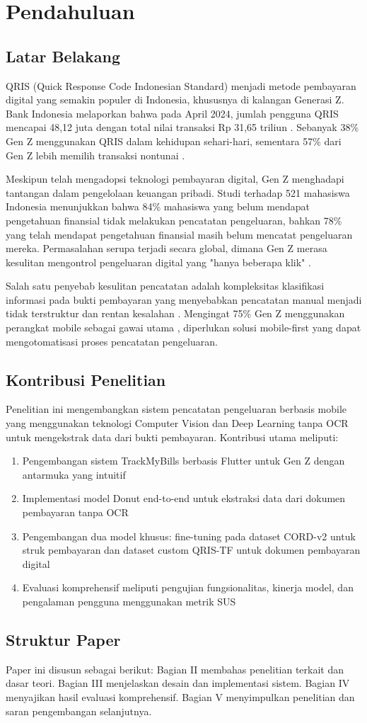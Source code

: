 \section{Pendahuluan}

\subsection{Latar Belakang}
QRIS (Quick Response Code Indonesian Standard) menjadi metode pembayaran digital yang semakin populer di Indonesia, khususnya di kalangan Generasi Z. Bank Indonesia melaporkan bahwa pada April 2024, jumlah pengguna QRIS mencapai 48,12 juta dengan total nilai transaksi Rp 31,65 triliun \cite{CNNqris2024}. Sebanyak 38\% Gen Z menggunakan QRIS dalam kehidupan sehari-hari, sementara 57\% dari Gen Z lebih memilih transaksi nontunai \cite{qris2023goodstats,jawapos2024qris}.

Meskipun telah mengadopsi teknologi pembayaran digital, Gen Z menghadapi tantangan dalam pengelolaan keuangan pribadi. Studi \cite{johan2021effect} terhadap 521 mahasiswa Indonesia menunjukkan bahwa 84\% mahasiswa yang belum mendapat pengetahuan finansial tidak melakukan pencatatan pengeluaran, bahkan 78\% yang telah mendapat pengetahuan finansial masih belum mencatat pengeluaran mereka. Permasalahan serupa terjadi secara global, dimana Gen Z merasa kesulitan mengontrol pengeluaran digital yang "hanya beberapa klik" \cite{lewis2019follow}.

Salah satu penyebab kesulitan pencatatan adalah kompleksitas klasifikasi informasi pada bukti pembayaran yang menyebabkan pencatatan manual menjadi tidak terstruktur dan rentan kesalahan \cite{kaye2014money}. Mengingat 75\% Gen Z menggunakan perangkat mobile sebagai gawai utama \cite{Campfire2024GenZ}, diperlukan solusi mobile-first yang dapat mengotomatisasi proses pencatatan pengeluaran.

\subsection{Kontribusi Penelitian}
Penelitian ini mengembangkan sistem pencatatan pengeluaran berbasis mobile yang menggunakan teknologi Computer Vision dan Deep Learning tanpa OCR untuk mengekstrak data dari bukti pembayaran. Kontribusi utama meliputi:

\begin{enumerate}
    \item Pengembangan sistem TrackMyBills berbasis Flutter untuk Gen Z dengan antarmuka yang intuitif
    \item Implementasi model Donut end-to-end untuk ekstraksi data dari dokumen pembayaran tanpa OCR
    \item Pengembangan dua model khusus: fine-tuning pada dataset CORD-v2 untuk struk pembayaran dan dataset custom QRIS-TF untuk dokumen pembayaran digital
    \item Evaluasi komprehensif meliputi pengujian fungsionalitas, kinerja model, dan pengalaman pengguna menggunakan metrik SUS
\end{enumerate}

\subsection{Struktur Paper}
Paper ini disusun sebagai berikut: Bagian II membahas penelitian terkait dan dasar teori. Bagian III menjelaskan desain dan implementasi sistem. Bagian IV menyajikan hasil evaluasi komprehensif. Bagian V menyimpulkan penelitian dan saran pengembangan selanjutnya.